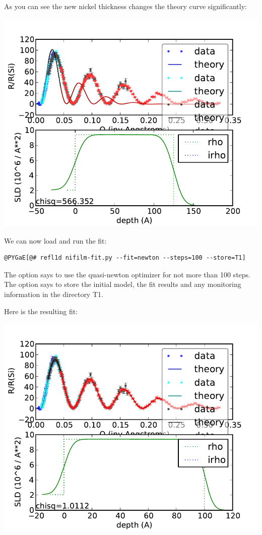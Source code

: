 \documentclass[letterpaper,10pt,english]{sphinxmanual}
\begin{document}
As you can see the new nickel thickness changes the theory curve
significantly:

\includegraphics{f0e3f5eecb.pdf}

We can now load and run the fit:

\begin{Verbatim}[commandchars=@\[\]]
@PYGaE[@# refl1d nifilm-fit.py --fit=newton --steps=100 --store=T1]
\end{Verbatim}

The  option says to use the quasi-newton optimizer for
not more than 100 steps.  The  option says to store the
initial model, the fit results and any monitoring information in the
directory T1.

Here is the resulting fit:

\includegraphics{fc43445452.pdf}
\end{document}

